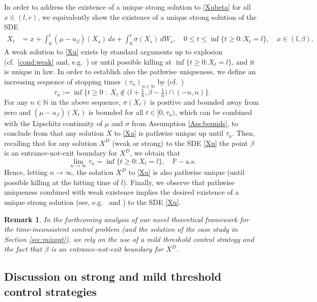 \documentclass[11pt]{article} %
\newtheorem{remark}[theorem]{Remark}
\def\N{\mathbb{N}}
\numberwithin{komcounter}{section}
\begin{document}
In order to address the existence of a unique strong solution to \eqref{Xubeta} for all $x\in(l,r)$, we equivalently show the existence of a unique strong solution of the SDE 
\begin{align} \label{Xu}
X_t &= x + \int_0^t (\mu - u_\beta)(X_s) \, ds + \int_0^t \sigma(X_s) \, dW_s, 
\quad  0 \leq t \leq \inf\{t\geq 0: X_t =l\}, \quad x\in(l,\beta).
\end{align}
A weak solution to \eqref{Xu} exists by standard arguments up to explosion (cf.~\eqref{cond:weak} and, e.g.~\cite[Chapter 5, Theorem 5.15]{Karatzas2}) or until possible killing at $\inf\{t\geq 0: X_t =l\}$, and it is unique in law. 
In order to establish also the pathwise uniqueness, we define an increasing sequence of stopping times $(\tau_n)_{n\in\N}$ by (cf.~\cite[Chapter 5, proof of Theorem 2.5]{Karatzas2})
$$
\tau_n := \inf \big\{t\geq 0 \;:\; X_t\not\in \big(l+\tfrac{1}{n},\beta-\tfrac{1}{n} \big) \cap (-n,n) \big\}.
$$
For any $n\in\N$ in the above sequence, $\sigma(X_t)$ is positive and bounded away from zero and $(\mu-u_\beta)(X_t)$ is bounded for all $t\in [0,\tau_n)$, which can be combined with the Lipschitz continuity of $\mu$ and $\sigma$ from Assumption \ref{Ass:bounds}, to conclude from  \cite{nakao1972pathwise} that any solution $X$ to \eqref{Xu} is pathwise unique up until $\tau_n$. 
Then, recalling that for any solution $X^D$ (weak or strong) to the SDE \eqref{Xu} the point $\beta$ is an entrance-not-exit boundary for $X^D$, we obtain that 
$$
\lim_{n \to \infty} \tau_n = \inf\{t\geq 0: X_t =l\}, \quad \mathbb{P}-\text{a.s.}
$$
Hence, letting $n \to \infty$, the solution $X^D$ to \eqref{Xu} is also pathwise unique (until possible killing at the hitting time of $l$). 
Finally, we observe that pathwise uniqueness combined with weak existence implies the desired existence of a unique strong solution (see, e.g.~\cite{yamada1971uniqueness} and \cite[Chapter 5]{Karatzas2}) to the SDE \eqref{Xu}. 

\begin{remark}
In the forthcoming analysis of our novel theoretical framework for the time-inconsistent control problem (and the solution of the case study in Section \ref{sec:mixopt}), we rely on the use of a mild threshold control strategy and the fact that $\beta$ is an entrance-not-exit boundary for $X^D$. 
\end{remark}



\subsection{Discussion on strong and mild threshold control strategies}
\label{sec:strong-mild}
\end{document}

